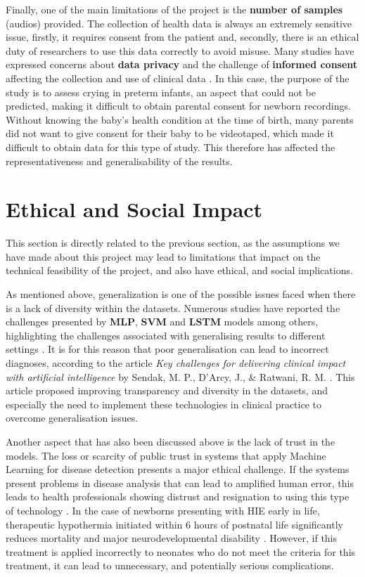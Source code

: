 Finally, one of the main limitations of the project is the \textbf{number of samples} (audios) provided. The collection of health data is always an extremely sensitive issue, firstly, it requires consent from the patient and, secondly, there is an ethical duty of researchers to use this data correctly to avoid misuse. Many studies have expressed concerns about \textbf{data privacy} \cite{stewart_empirical_2002} and the challenge of \textbf{informed consent} \cite{dickson_enduring_2015} affecting the collection and use of clinical data \cite{whitley_consent_2012}. In this case, the purpose of the study is to assess crying in preterm infants, an aspect that could not be predicted, making it difficult to obtain parental consent for newborn recordings. Without knowing the baby’s health condition at the time of birth, many parents did not want to give consent for their baby to be videotaped, which made it difficult to obtain data for this type of study. This therefore has affected the representativeness and generalisability of the results.


\section{Ethical and Social Impact}
This section is directly related to the previous section, as the assumptions we have made about this project may lead to limitations that impact on the technical feasibility of the project, and also have ethical, and social implications. 

As mentioned above, generalization is one of the possible issues faced when there is a lack of diversity within the datasets. Numerous studies have reported the challenges presented by \textbf{MLP}, \textbf{SVM} and \textbf{LSTM} models among others, highlighting the challenges associated with generalising results to different settings \cite{Rahimzad2021, Oukhouya2023, Lakshminarayanan2019}. It is for this reason that poor generalisation can lead to incorrect diagnoses, according to the article \textit{Key challenges for delivering clinical impact with artificial intelligence} by Sendak, M. P., D'Arcy, J., & Ratwani, R. M. \cite{Kelly2021}. This article proposed improving transparency and diversity in the datasets, and especially the need to implement these technologies in clinical practice to overcome generalisation issues. 

Another aspect that has also been discussed above is the lack of trust in the models. The loss or scarcity of public trust in systems that apply Machine Learning for disease detection presents a major ethical challenge. If the systems present problems in disease analysis that can lead to amplified human error, this leads to health professionals showing distrust and resignation to using this type of technology \cite{Murphy2021}. In the case of newborns presenting with HIE early in life, therapeutic hypothermia initiated within 6 hours of postnatal life significantly reduces mortality and major neurodevelopmental disability \cite{Tagin2012}. However, if this treatment is applied incorrectly to neonates who do not meet the criteria for this treatment, it can lead to unnecessary, and potentially serious complications.

